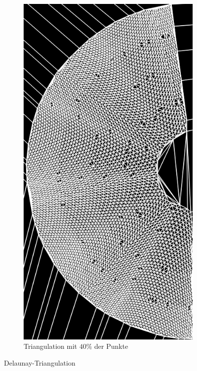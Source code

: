 \begin{figure}[!htb]
\begin{subfigure}{.9\textwidth}
		\includegraphics[angle=-90, width=.8\textwidth]{images/delaunay2.png}
		\caption{Triangulation mit $40\%$ der Punkte}
	\end{subfigure}
	\caption{Delaunay-Triangulation}
	\label{fig:delaunayTriag}
\end{figure}




